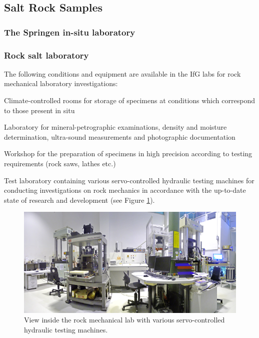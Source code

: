 \subsection{Salt Rock Samples}
\label{subsec:salt}

\subsubsection{The Springen in-situ laboratory}
\label{sec:springen}

\subsubsection{Rock salt laboratory}

The following conditions and equipment are available in the IfG labs for rock mechanical laboratory investigations:

\begin{list}{-}{\leftmargin=1em \itemindent=0em \itemsep=0.1em}
\item Climate-controlled rooms for storage of specimens at conditions which correspond to those present in situ
\item Laboratory for mineral-petrographic examinations, density and moisture determination, ultra-sound measurements and 
photographic documentation
\item Workshop for the preparation of specimens in high precision according to testing requirements (rock saws, lathes etc.)
\item Test laboratory containing various servo-controlled hydraulic testing machines for conducting investigations on 
rock mechanics in accordance with the up-to-date state of research and development (see Figure \ref{fig:ifglabph1}).
\end{list} 

\begin{figure}[!ht]
\centering
\includegraphics[width=1\textwidth]{./figures/ifg-lab-photo1-v2.png}
\caption{View inside the rock mechanical lab with various servo-controlled hydraulic testing machines.}
\label{fig:ifglabph1}
\end{figure}

